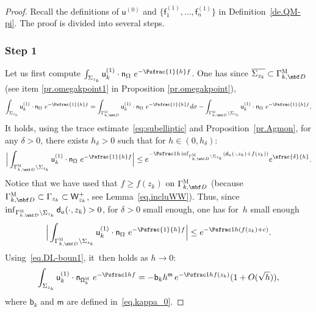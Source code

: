 \begin{proof} Recall the definitions of $\mathsf u^{(0)}$
and $\{\mathsf f_1^{(1)}, \ldots, \mathsf f_n^{(1)}\} $ in Definition~\ref{de.QM-pi}.
The proof is divided into several steps.

\subsubsection*{Step 1} Let us first compute $ \int_{\Sigma_{z_k}} \mathsf u_k^{(1)} \cdot \mathsf n_\Omega \ e^{- \Psfrac{1}{h} f} $. One has since $\overline{\Sigma_{z_k}} \subset \Gamma_{k,\mbf D}^{ \textsc{M} }$ (see item \eqref{pr.omegakpoint1} in Proposition \ref{pr.omegakpoint}),
\begin{align*}
\int_{\Sigma_{z_k}} \mathsf u_k^{(1)} \cdot \mathsf n_\Omega \ e^{- \Psfrac{1}{h} f} = \int_{\Gamma_{k,\mbf D}^{ \textsc{M} } } \mathsf u_k^{(1)} \cdot \mathsf n_\Omega \ e^{- \Psfrac{1}{h} f} d\sigma - \int_{\Gamma_{k,\mbf D}^{ \textsc{M} } \setminus \Sigma_{z_k} } \mathsf u_k^{(1)} \cdot \mathsf n_\Omega \ e^{- \Psfrac{1}{h} f}.
\end{align*}
It holds, using the trace estimate~\eqref{eq:subelliptic} and Proposition~\ref{pr.Agmon}, for any $\delta>0$, there exists $h_\delta>0$ such that for $h\in (0,h_\delta)$:
\[
\Big \vert \int_{\Gamma_{k,\mbf D}^{ \textsc{M} } \setminus \Sigma_{z_k} } \mathsf u_k^{(1)} \cdot \mathsf n_\Omega \ e^{- \Psfrac{1}{h} f} \Big \vert \le e^{-\Psfrac 1h \inf_{\Gamma_{k,\mbf D}^{ \textsc{M} } \setminus \Sigma_{z_k}}(\mathsf d_a(\cdot, z_k)+f(z_k))} e^{\sfrac{ \delta }{h}}.
\]
Notice that we have used that $f\ge f(z_k)$ on $\Gamma_{k,\mbf D}^{ \textsc{M} }$ (because $\Gamma_{k,\mbf D}^{ \textsc{M} }\subset \Gamma_{z_k} \subset \mathsf W_{z_k}^+$, see Lemma~\ref{eq.incluWW}).
Thus, since $\inf_{\Gamma_{k,\mbf D}^{ \textsc{M} } \setminus \Sigma_{z_k}}\mathsf d_a(\cdot, z_k)>0$, for $\delta>0$ small enough, one has for~$h$ small enough
\begin{align}\label{eq.ici2}
\Big \vert \int_{\Gamma_{k,\mbf D}^{ \textsc{M} } \setminus \Sigma_{z_k} } \mathsf u_k^{(1)} \cdot \mathsf n_\Omega \ e^{- \Psfrac{1}{h} f} \Big \vert \le e^{-\Psfrac 1h (f(z_k)+c)}.
\end{align}
Using~\eqref{eq.DL-boun1}, it~then holds as $h\to 0$:
\begin{align*}
\int_{\Sigma_{z_k}}\mathsf u^{(1)}_k \cdot \mathsf n_{ \mathsf \Omega_k^{\textsc{M}} }\ e^{-\Psfrac 1hf}=-\mathsf b_k h^{\mathsf m} \, e^{-\Psfrac 1h f(z_k)} (1+O(\sqrt h)),
\end{align*}
where $\mathsf b_k$ and $\mathsf m$ are defined in~\eqref{eq.kappa_0}.


\end{proof}
